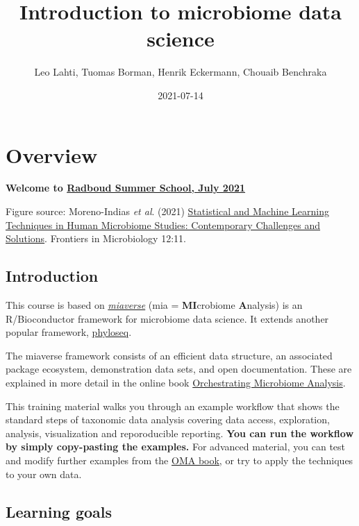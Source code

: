 \documentclass[
]{book}
\title{Introduction to microbiome data science}
\author{Leo Lahti, Tuomas Borman, Henrik Eckermann, Chouaib Benchraka}
\date{2021-07-14}
\begin{document}
\maketitle

{
\setcounter{tocdepth}{1}
\tableofcontents
}
\hypertarget{overview}{%
\chapter{Overview}\label{overview}}

\textbf{Welcome to \href{https://www.ru.nl/radboudsummerschool/courses/2021/brain-bacteria-behaviour/}{Radboud Summer School, July 2021}}

Figure source: Moreno-Indias \emph{et al}. (2021) \href{https://doi.org/10.3389/fmicb.2021.635781}{Statistical and Machine Learning Techniques in Human Microbiome Studies: Contemporary Challenges and Solutions}. Frontiers in Microbiology 12:11.

\hypertarget{introduction}{%
\section{Introduction}\label{introduction}}

This course is based on \href{https://microbiome.github.io}{\emph{miaverse}} (mia = \textbf{MI}crobiome \textbf{A}nalysis) is an
R/Bioconductor framework for microbiome data science. It extends another popular framework, \href{https://joey711.github.io/phyloseq/}{phyloseq}.

The miaverse framework consists of an efficient data structure, an
associated package ecosystem, demonstration data sets, and open
documentation. These are explained in more detail in the online book
\href{https://microbiome.github.io/OMA}{Orchestrating Microbiome Analysis}.

This training material walks you through an example workflow that
shows the standard steps of taxonomic data analysis covering data
access, exploration, analysis, visualization and reporoducible
reporting. \textbf{You can run the workflow by simply copy-pasting the
examples.} For advanced material, you can test and modify further
examples from the \href{https://microbiome.github.io/OMA}{OMA book}, or try
to apply the techniques to your own data.

\hypertarget{learning-goals}{%
\section{Learning goals}\label{learning-goals}}
\end{document}
